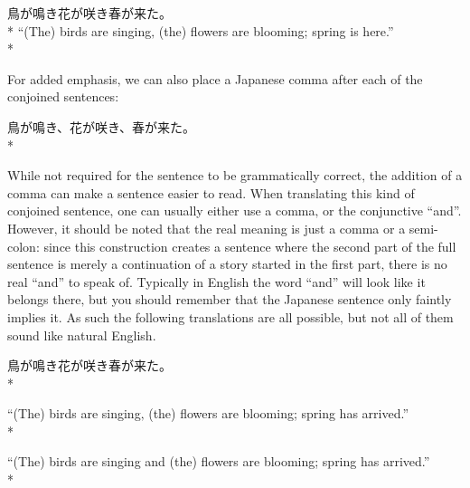\documentclass[11pt, b5paper, twoside, openright, onecolumn]{book}
\newenvironment{exampleblock}{
\setlength{\parindent}{0.6in}
\begin{minipage}[t]{\dimexpr\textwidth-\parindent}}
{\end{minipage}}
\begin{document}
\vspace{0.4cm}
\begin{exampleblock}
鳥が鳴き花が咲き春が来た。 \\* 
“(The) birds are singing‚ (the) flowers are blooming; spring is here.” \\* 
\end{exampleblock}
\vspace{0.2cm}

For added emphasis‚ we can also place a Japanese comma after each of the conjoined sentences:

\vspace{0.4cm}
\begin{exampleblock}
鳥が鳴き、花が咲き、春が来た。 \\* 
\end{exampleblock}
\vspace{0.2cm}

While not required for the sentence to be grammatically correct‚ the addition of a comma can make a sentence easier to read. When translating this kind of conjoined sentence‚ one can usually either use a comma‚ or the conjunctive “and”. However‚ it should be noted that the real meaning is just a comma or a semi-colon: since this construction creates a sentence where the second part of the full sentence is merely a continuation of a story started in the first part‚ there is no real “and” to speak of. Typically in English the word “and” will look like it belongs there‚ but you should remember that the Japanese sentence only faintly implies it. As such the following translations are all possible‚ but not all of them sound like natural English.

\vspace{0.4cm}
\begin{exampleblock}
鳥が鳴き花が咲き春が来た。 \\* 
\end{exampleblock}
\vspace{0.2cm}

\begin{exampleblock}
“(The) birds are singing‚ (the) flowers are blooming; spring has arrived.” \\* 
\end{exampleblock}
\vspace{0.2cm}

\begin{exampleblock}
“(The) birds are singing and (the) flowers are blooming; spring has arrived.” \\* 
\end{exampleblock}
\vspace{0.2cm}
\end{document}

